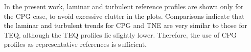 



In the present work, laminar and turbulent reference profiles are shown only for the \gls{CPG} case, to avoid excessive clutter in the plots. Comparisons indicate that the laminar and turbulent trends for \gls{CPG} and \gls{TNE} are very similar to those for \gls{TEQ}, although the \gls{TEQ} profiles lie slightly lower. Therefore, the use of \gls{CPG} profiles as representative references is sufficient.


